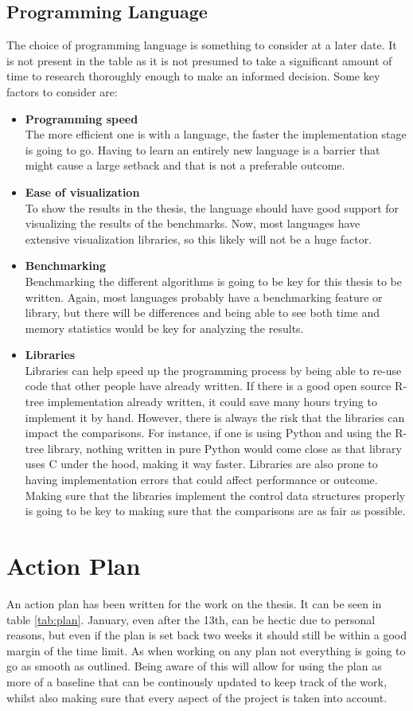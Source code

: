 \subsection{Programming Language}
The choice of programming language is something to consider at a later date. It is not present in the table as it is not presumed to take a significant amount of time to research thoroughly enough to make an informed decision. Some key factors to consider are:
\begin{itemize}
	\item \textbf{Programming speed} \\ The more efficient one is with a language, the faster the implementation stage is going to go. Having to learn an entirely new language is a barrier that might cause a large setback and that is not a preferable outcome.
	\item \textbf{Ease of visualization} \\ To show the results in the thesis, the language should have good support for visualizing the results of the benchmarks. Now, most languages have extensive visualization libraries, so this likely will not be a huge factor.
	\item \textbf{Benchmarking} \\ Benchmarking the different algorithms is going to be key for this thesis to be written. Again, most languages probably have a benchmarking feature or library, but there will be differences and being able to see both time and memory statistics would be key for analyzing the results.
	\item \textbf{Libraries} \\ Libraries can help speed up the programming process by being able to re-use code that other people have already written. If there is a good open source R-tree implementation already written, it could save many hours trying to implement it by hand. However, there is always the risk that the libraries can impact the comparisons. For instance, if one is using Python and using the R-tree library, nothing written in pure Python would come close as that library uses C under the hood, making it way faster. Libraries are also prone to having implementation errors that could affect performance or outcome. Making sure that the libraries implement the control data structures properly is going to be key to making sure that the comparisons are as fair as possible.
\end{itemize}

\section{Action Plan}
An action plan has been written for the work on the thesis. It can be seen in table \ref{tab:plan}. January, even after the 13th, can be hectic due to personal reasons, but even if the plan is set back two weeks it should still be within a good margin of the time limit. As when working on any plan not everything is going to go as smooth as outlined. Being aware of this will allow for using the plan as more of a baseline that can be continously updated to keep track of the work, whilst also making sure that every aspect of the project is taken into account.


